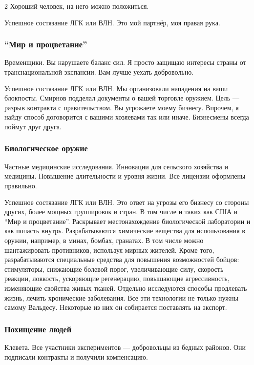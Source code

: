 \documentclass[twoside]{article}
\begin{document}
\begin{multicols}{2}
Хороший человек, на него можно положиться.

Успешное состязание ЛГК или ВЛН. Это мой партнёр, моя правая рука.

\subsubsection{\enquote{Мир и процветание}}\label{pap-valdes}

Временщики. Вы нарушаете баланс сил. Я просто защищаю интересы страны от
транснациональной экспансии. Вам лучше уехать добровольно.

Успешное состязание ЛГК или ВЛН. Мы организовали нападения на ваши
блокпосты. Смирнов подделал документы о вашей торговле оружием. Цель ---
разрыв контракта с правительством. Вы угрожаете моему бизнесу. Впрочем,
я найду способ договорится с вашими хозяевами так или иначе. Бизнесмены
всегда поймут друг друга.

\subsubsection{Биологическое оружие}\label{biological-weapons}

Частные медицинские исследования. Инновации для сельского хозяйства и
медицины. Повышение длительности и уровня жизни. Все лицензии оформлены
правильно.

Успешное состязание ЛГК или ВЛН. Это ответ на угрозы его бизнесу со
стороны других, более мощных группировок и стран. В том числе и таких
как США и \enquote{Мир и процветание}. Раскрывает местонахождение биологической
лаборатории и как попасть внутрь. Разрабатываются химические вещества
для использования в оружии, например, в минах, бомбах, гранатах. В том
числе можно шантажировать противников, используя мирных жителей. Кроме
того, разрабатываются специальные средства для повышения возможностей
бойцов: стимуляторы, снижающие болевой порог, увеличивающие силу,
скорость реакции, ловкость, ускоряющие регенерацию, повышающие
агрессивность, изменяющие свойства живых тканей. Отдельно исследуются
способы продлевать жизнь, лечить хронические заболевания. Все эти
технологии не только нужны самому Вальдесу. Некоторые из них он
собирается поставлять на экспорт.

\subsubsection{Похищение людей}\label{kidnapping-valdes}

Клевета. Все участники экспериментов --- добровольцы из бедных районов.
Они подписали контракты и получили компенсацию.


\end{multicols}
\end{document}
